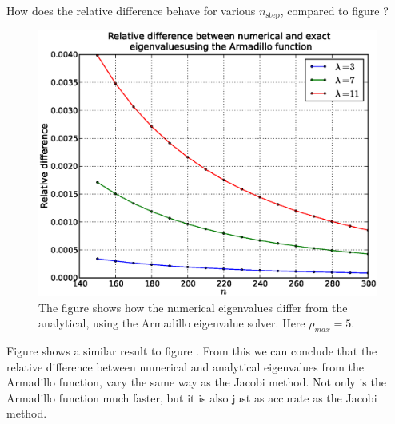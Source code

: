 How does the relative
difference behave for various $n_{\mathrm{step}}$, compared to figure ? 
%
\begin{figure}[htpb]
	\centering
	\includegraphics[width=1.0\textwidth]{images/armareldiff2.eps}
	\caption{The figure shows how the numerical eigenvalues differ from the analytical,
		using the Armadillo eigenvalue solver. Here $\rho_{max} = 5$.}
	\label{fig:armareldiff}
\end{figure}
%
Figure  shows a similar result to figure . From this we
can conclude that the relative difference between numerical and analytical eigenvalues
from the Armadillo function, vary the same way as the Jacobi method. Not only is the
Armadillo function much faster, but it is also just as accurate as the Jacobi method.

